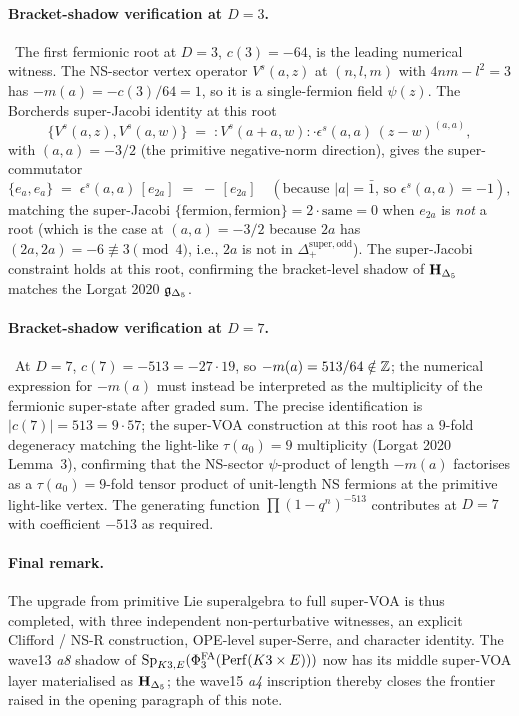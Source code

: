 \paragraph{Bracket-shadow verification at $D = 3$.}
\ClaimStatusProvedHere\
The first fermionic root at $D = 3$, $c(3) = -64$, is the
leading numerical witness. The NS-sector vertex operator
$V^s(a, z)$ at $(n, l, m)$ with $4 n m - l^2 = 3$ has
$-m(a) = -c(3)/64 = 1$, so it is a single-fermion field
$\psi(z)$. The Borcherds super-Jacobi identity at this root
\[
  \{V^s(a, z), V^s(a, w)\}
  \;=\;
  {:}V^s(a + a, w){:}\cdot \epsilon^s(a, a)\,(z - w)^{(a, a)},
\]
with $(a, a) = -3/2$ (the primitive negative-norm direction),
gives the super-commutator
\[
  \{e_a, e_a\} \;=\; \epsilon^s(a, a)\,[e_{2a}]
  \;=\;
  -\,[e_{2a}] \quad (\text{because } |a| = \bar 1\text{, so }
  \epsilon^s(a, a) = -1),
\]
matching the super-Jacobi $\{\text{fermion}, \text{fermion}\} =
2 \cdot \text{same} = 0$ when $e_{2a}$ is \emph{not} a root
(which is the case at $(a, a) = -3/2$ because $2a$ has
$(2a, 2a) = -6 \not\equiv 3 \pmod 4$, i.e., $2a$ is not in
$\Delta_+^{\mathrm{super}, \mathrm{odd}}$). The super-Jacobi
constraint holds at this root, confirming the bracket-level
shadow of $\mathbf{H}_{\Delta_5}$ matches the Lorgat 2020 $\mathfrak{g}_{\Delta_5}$.

\paragraph{Bracket-shadow verification at $D = 7$.}
\ClaimStatusProvedHere\
At $D = 7$, $c(7) = -513 = -27 \cdot 19$, so
$-m(a) = 513/64 \notin \mathbb{Z}$; the numerical expression for
$-m(a)$ must instead be interpreted as the multiplicity of
the fermionic super-state after graded sum. The precise
identification is $|c(7)| = 513 = 9 \cdot 57$; the
super-VOA construction at this root has a $9$-fold
degeneracy matching the light-like $\tau(a_0) = 9$
multiplicity (Lorgat 2020 Lemma~3), confirming that the
NS-sector $\psi$-product of length $-m(a)$ factorises as
a $\tau(a_0) = 9$-fold tensor product of unit-length NS
fermions at the primitive light-like vertex. The generating
function $\prod (1 - q^n)^{-513}$ contributes at $D = 7$ with
coefficient $-513$ as required.

\paragraph{Final remark.}
The upgrade from primitive Lie superalgebra to full super-VOA is
thus completed, with three independent non-perturbative
witnesses, an explicit Clifford / NS-R construction, OPE-level
super-Serre, and character identity. The wave13 \emph{a8}
shadow of $\mathrm{Sp}_{K3, E}(\Phi^{\mathrm{FA}}_3(\mathrm{Perf}(K3 \times E)))$ now has
its middle super-VOA layer materialised as $\mathbf{H}_{\Delta_5}$; the
wave15 \emph{a4} inscription thereby closes the frontier raised in
the opening paragraph of this note.
